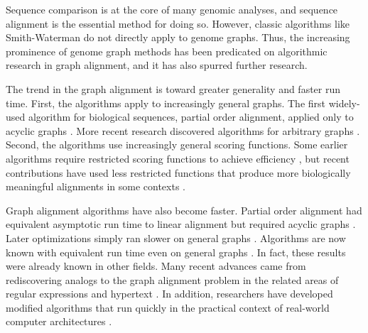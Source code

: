 Sequence comparison is at the core of many genomic analyses, and sequence alignment is the essential method for doing so. 
However, classic algorithms like Smith-Waterman \cite{Smith_1981} do not directly apply to genome graphs. 
Thus, the increasing prominence of genome graph methods has been predicated on algorithmic research in graph alignment, and it has also spurred further research.

The trend in the graph alignment is toward greater generality and faster run time. 
First, the algorithms apply to increasingly general graphs. 
The first widely-used algorithm for biological sequences, partial order alignment, applied only to acyclic graphs \cite{Lee_2002, Grasso_2004}. 
More recent research discovered algorithms for arbitrary graphs \cite{Antipov_2015, Rautiainen_2017, Jain_2019a}. 
Second, the algorithms use increasingly general scoring functions. 
Some earlier algorithms require restricted scoring functions to achieve efficiency \cite{Rautiainen_2017}, but recent contributions have used less restricted functions that produce more biologically meaningful alignments in some contexts \cite{Jain_2019a}.

Graph alignment algorithms have also become faster.
Partial order alignment had equivalent asymptotic run time to linear alignment but required acyclic graphs \cite{Lee_2002}. 
Later optimizations simply ran slower on general graphs \cite{Kavya_2019}.
Algorithms are now known with equivalent run time even on general graphs \cite{Jain_2019a}.
In fact, these results were already known in other fields.
Many recent advances came from rediscovering analogs to the graph alignment problem in the related areas of regular expressions and hypertext \cite{Myers_1989, Amir_1997, Navarro_2000}. %
In addition, researchers have developed modified algorithms that run quickly in the practical context of real-world computer architectures \cite{Suzuki_2018, Rautiainen_2019, Jain_2019b}.


